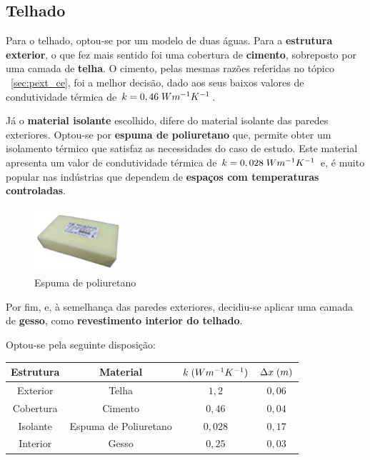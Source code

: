\documentclass[12pt, a4paper]{article}
\begin{document}



\subsection{Telhado}\label{sub:Telhado}

Para o telhado, optou-se por um modelo de duas águas. Para a \textbf{estrutura exterior}, o que fez mais sentido foi
uma cobertura de \textbf{cimento}, sobreposto por uma camada de \textbf{telha}. O cimento, pelas mesmas razões referidas no tópico
~\ref{sec:pext_ce}, foi a melhor decisão, dado aos seus baixos valores de condutividade térmica de $k=0,46 \hspace{1mm} Wm^{-1}K^{-1}$.

Já o \textbf{material isolante} escolhido, difere do material isolante das paredes exteriores. Optou-se
por \textbf{espuma de poliuretano} que, permite obter um isolamento térmico que satisfaz as necessidades
do caso de estudo. Este material apresenta um valor de condutividade térmica de
$k=0,028 \hspace{1mm} Wm^{-1}K^{-1}$ e, é muito popular nas indústrias que dependem de \textbf{espaços
	com temperaturas controladas}.

\begin{figure}[htpb]
	\centering
	\includegraphics[width=0.3\textwidth]{espuma_poliuretano.jpg}
	\caption{Espuma de poliuretano}\label{fig:poliuretano}
\end{figure}

Por fim, e, à semelhança das paredes exteriores, decidiu-se aplicar uma camada de \textbf{gesso}, como
\textbf{revestimento interior do telhado}.

Optou-se pela seguinte disposição:

\begin{center}
	\begin{tabular}{||c c c c||}
		\hline
		Estrutura & Material              & $k \hspace{1mm} (Wm^{-1}K^{-1})$ & $\Delta x \hspace{1mm} (m)$ \\ [0.5ex]
		\hline\hline
		Exterior  & Telha                 & $1,2$                            & $0,06$                      \\
		\hline
		Cobertura & Cimento               & $0,46$                           & $0,04$                      \\
		\hline
		Isolante  & Espuma de Poliuretano & $0,028$                          & $0,17$                      \\
		\hline
		Interior  & Gesso                 & $0,25$                           & $0,03$                      \\
		\hline
	\end{tabular}
\end{center}
\end{document}

